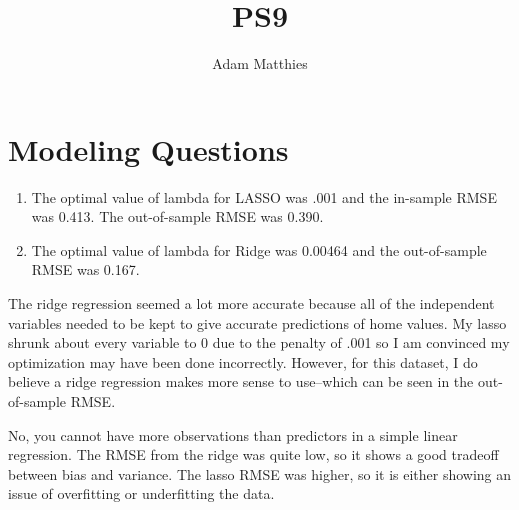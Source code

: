 \documentclass[12pt]{article}
\begin{document}
 
\title{PS9}
\author{Adam Matthies\\}

\maketitle

\section{Modeling Questions}


\begin{enumerate}
\item The optimal value of lambda for LASSO was .001 and the in-sample RMSE was 0.413. The
out-of-sample RMSE was 0.390.
\item The optimal value of lambda for Ridge was 0.00464 and the out-of-sample RMSE was 0.167.

\end{enumerate}

The ridge regression seemed a lot more accurate because all of the independent variables needed to 
be kept to give accurate predictions of home values. My lasso shrunk about every variable to 0
due to the penalty of .001 so I am convinced my optimization may have been done incorrectly. However,
for this dataset, I do believe a ridge regression makes more sense to use--which can be seen in the
out-of-sample RMSE. 

No, you cannot have more observations than predictors in a simple linear regression. The RMSE from
the ridge was quite low, so it shows a good tradeoff between bias and variance. The lasso RMSE was
higher, so it is either showing an issue of overfitting or underfitting the data.

 
\end{document}
